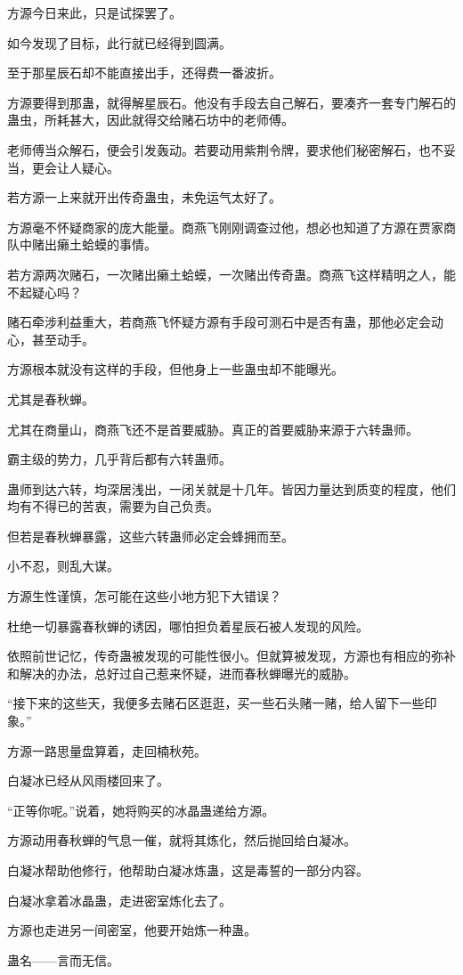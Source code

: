 \begin{this_body}
方源今日来此，只是试探罢了。

如今发现了目标，此行就已经得到圆满。

至于那星辰石却不能直接出手，还得费一番波折。

方源要得到那蛊，就得解星辰石。他没有手段去自己解石，要凑齐一套专门解石的蛊虫，所耗甚大，因此就得交给赌石坊中的老师傅。

老师傅当众解石，便会引发轰动。若要动用紫荆令牌，要求他们秘密解石，也不妥当，更会让人疑心。

若方源一上来就开出传奇蛊虫，未免运气太好了。

方源毫不怀疑商家的庞大能量。商燕飞刚刚调查过他，想必也知道了方源在贾家商队中赌出癞土蛤蟆的事情。

若方源两次赌石，一次赌出癞土蛤蟆，一次赌出传奇蛊。商燕飞这样精明之人，能不起疑心吗？

赌石牵涉利益重大，若商燕飞怀疑方源有手段可测石中是否有蛊，那他必定会动心，甚至动手。

方源根本就没有这样的手段，但他身上一些蛊虫却不能曝光。

尤其是春秋蝉。

尤其在商量山，商燕飞还不是首要威胁。真正的首要威胁来源于六转蛊师。

霸主级的势力，几乎背后都有六转蛊师。

蛊师到达六转，均深居浅出，一闭关就是十几年。皆因力量达到质变的程度，他们均有不得已的苦衷，需要为自己负责。

但若是春秋蝉暴露，这些六转蛊师必定会蜂拥而至。

小不忍，则乱大谋。

方源生性谨慎，怎可能在这些小地方犯下大错误？

杜绝一切暴露春秋蝉的诱因，哪怕担负着星辰石被人发现的风险。

依照前世记忆，传奇蛊被发现的可能性很小。但就算被发现，方源也有相应的弥补和解决的办法，总好过自己惹来怀疑，进而春秋蝉曝光的威胁。

“接下来的这些天，我便多去赌石区逛逛，买一些石头赌一赌，给人留下一些印象。”

方源一路思量盘算着，走回楠秋苑。

白凝冰已经从风雨楼回来了。

“正等你呢。”说着，她将购买的冰晶蛊递给方源。

方源动用春秋蝉的气息一催，就将其炼化，然后抛回给白凝冰。

白凝冰帮助他修行，他帮助白凝冰炼蛊，这是毒誓的一部分内容。

白凝冰拿着冰晶蛊，走进密室炼化去了。

方源也走进另一间密室，他要开始炼一种蛊。

蛊名——言而无信。

\end{this_body}

